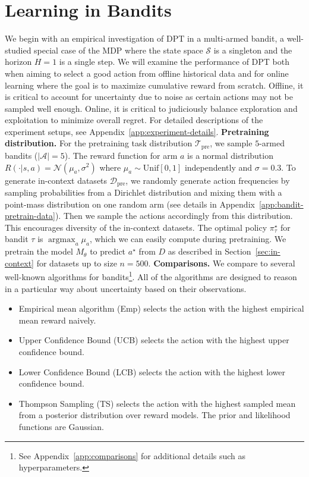 \documentclass{article}
\newcommand{\Acal}{\mathcal{A}}
\newcommand{\Dcal}{\mathcal{D}}
\newcommand{\Ncal}{\mathcal{N}}
\newcommand{\Scal}{{\mathcal{S}}}
\newcommand{\Tcal}{{\mathcal{T}}}
\newcommand*{\argmax}{\mathop{\mathrm{argmax}}}
\newcommand{\pretraind}{\Dcal_{\text{pre}}}
\newcommand{\pretraint}{\Tcal_{\text{pre}}}
\newcommand{\macroName}{DPT}
\newcommand{\unif}{\text{Unif}}
\newcommand{\pistar}{\pi^{\star}}
\begin{document}
\section{Learning in Bandits}\label{sec:bandits}
We begin with an empirical investigation of \macroName{} in a multi-armed bandit, a
well-studied special case of the MDP where the state space $\Scal$ is a singleton and the horizon $H = 1$ is a single step. We will examine the performance of \macroName{} both when aiming to select a good action from offline historical data and for online learning where the goal is to maximize cumulative reward from scratch. Offline, it is critical to account for uncertainty due to noise as certain actions may not be sampled well enough. Online, it is critical to judiciously balance exploration and exploitation to minimize overall regret. For detailed descriptions of the experiment setups, see Appendix~\ref{app:experiment-details}.
\textbf{Pretraining distribution.} For the pretraining task distribution $\pretraint$, we sample $5$-armed bandits ($|\Acal| = 5$). The reward function for arm $a$ is a normal distribution $R(\cdot | s,a) = \Ncal(\mu_a, \sigma^2)$ where $\mu_a \sim \unif[0, 1]$ independently and $\sigma = 0.3$. To generate in-context datasets $\pretraind$, we randomly generate action frequencies by sampling probabilities from a Dirichlet distribution and mixing them with a point-mass distribution on one random arm (see details in Appendix~\ref{app:bandit-pretrain-data}). Then we sample the actions accordingly from  this distribution. This encourages diversity of the in-context datasets. The optimal policy $\pistar_{\tau}$ for bandit $\tau$ is $\argmax_{a} \mu_a$, which we can easily compute during pretraining. We pretrain the model $M_{\theta}$ to predict $a^\star$ from $D$ as described in Section~\ref{sec:in-context} for datasets up to size $n = 500$.
\textbf{Comparisons.}
We compare to several well-known algorithms for bandits\footnote{See Appendix~\ref{app:comparisons} for additional details such as hyperparameters.}. All of the algorithms are designed to reason in a particular way about uncertainty based on their observations.
\begin{itemize}[leftmargin=1em,noitemsep]
\item Empirical mean algorithm (Emp) selects the action with the highest empirical mean reward naively.
\item Upper Confidence Bound (UCB) selects the action with the highest  upper confidence bound.
\item Lower Confidence Bound (LCB) selects the action with the highest lower confidence bound.
\item Thompson Sampling (TS) selects the action with the highest sampled mean from a posterior distribution over reward models. The prior and likelihood functions are Gaussian.
\end{itemize}
\end{document}
